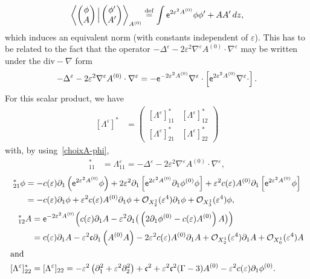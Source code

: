 \documentclass[10pt]{amsart}
\theoremstyle{definition}\newtheorem{defi}[theo]{Definition}\newtheorem{rema}[theo]{Remark}\newtheorem{exam}[theo]{Example}\newtheorem{exem}[theo]{Example}\newtheorem{nota}[theo]{Notation}
\newcommand*\p{\partial}
\newcommand*\ddef{\stackrel{\rm def}{=}}
\newcommand{\divv}{\mathrm{div}}
\newcommand*\BO{\mathcal{O}}
\newcommand*\ex{{\sf e}}
\newcommand*\cs{{\mathfrak c}}
\newcommand*\e{\varepsilon}
\begin{document}
\[
\left\langle
\begin{pmatrix} \phi \\ A
\end{pmatrix} \Big|
\begin{pmatrix} \phi' \\ A'
\end{pmatrix} \right\rangle_{A^{(0)}}
\ddef \int \ex^{ 2 \e^2 A^{(0)} } \phi \phi' + A A' \, dz,
\]
which induces an equivalent norm (with constants independent of $ \e $). This has to be related to the fact that the operator $ - \Delta^\e - 2 \e^2 \nabla^\e A^{(0)} \cdot \nabla^\e $ may be written under the $ \divv - \nabla $ form
\[
- \Delta^\e - 2 \e^2 \nabla^\e A^{(0)} \cdot \nabla^\e = - \ex^{- 2 \e^2 A^{(0)} } \nabla^\e \cdot \left[\ex^{2 \e^2 A^{(0)} } \nabla^\e \cdot\right].
\]
For this scalar product, we have
\begin{align*}
\left[\Lambda^\e\right]^* & =
\begin{pmatrix}
[\Lambda^\e]^*_{11} & [\Lambda^\e]^*_{12} \\
[\Lambda^\e]^{*}_{21} & [\Lambda^\e]^{*}_{22}
\end{pmatrix}
\end{align*}
with, by using~\eqref{choixA-phi},
\begin{align*}
[\Lambda^\e]^{*}_{11} & = \Lambda^\e_{11} = - \Delta^\e - 2 \e^2 \nabla^\e A^{(0)} \cdot \nabla^\e,
\end{align*}
\begin{align*}
[\Lambda^\e]^{*}_{21} \phi & = - c(\e) \p_{1} \left(\ex^{ 2 \e^2 A^{(0)} } \phi\right) + 2 \e^2 \p_1 \left[\ex^{ 2 \e^2 A^{(0)} } \p_1 \phi^{(0)} \phi\right] + \e^2 c(\e) A^{(0)} \p_1 \left[\ex^{ 2 \e^2 A^{(0)} } \phi\right]
\\ & = - c(\e) \p_{1} \phi + \e^2 c(\e) A^{(0)} \p_1 \phi + \BO_{X^1_2} (\e^4) \p_1 \phi + \BO_{X^1_3} (\e^4) \phi,
\end{align*}
\begin{align*}
[\Lambda^\e]^{*}_{12} A & = \ex^{-2 \e^2 A^{(0)} } \Big(c(\e) \p_{1} A - \e^2 \p_1 \big(\left(2 \p_{1} \phi^{(0)} - c(\e) A^{(0)}\right) A \big) \Big)
\\ & = c(\e) \p_{1} A - \e^2 \cs \p_1 \left(A^{(0)} A\right) - 2 \e^2 c(\e) A^{(0)} \p_1 A + \BO_{X^1_2} (\e^4) \p_1 A + \BO_{X^1_6} (\e^4) A
\\
\intertext{and}
[\Lambda^\e]^{*}_{22} & = [\Lambda^\e]_{22} = - \e^2 \left(\p_{1}^2 + \e^2 \p_{2}^2\right) + \cs^2 + \e^2 \cs^2 (\Gamma -3) A^{(0)} - \e^2 c(\e) \p_1 \phi^{(0)}.
\end{align*}
\end{document}
